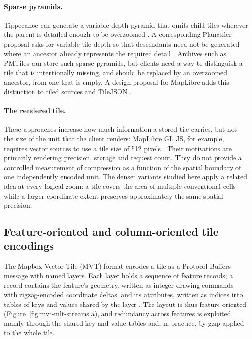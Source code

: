 \paragraph{Sparse pyramids.} Tippecanoe can generate a variable-depth pyramid that omits
child tiles wherever the parent is detailed enough to be overzoomed \citep{tippecanoe}.
A corresponding Planetiler proposal asks for variable tile depth so that descendants
need not be generated where an ancestor already represents the required detail
\citep{planetiler_1574}. Archives such as PMTiles can store such sparse pyramids, but
clients need a way to distinguish a tile that is intentionally missing, and should be
replaced by an overzoomed ancestor, from one that is empty. A design proposal for
MapLibre adds this distinction to tiled sources and TileJSON
\citep{maplibre_stylespec_1869}.

\paragraph{The rendered tile.} These approaches increase how much information a stored
tile carries, but not the size of the unit that the client renders: MapLibre GL JS, for
example, requires vector sources to use a tile size of 512 pixels
\citep{maplibre_gljs_vectorsource}. Their motivations are primarily rendering precision,
storage and request count. They do not provide a controlled measurement of compression
as a function of the spatial boundary of one independently encoded unit. The denser
variants studied here apply a related idea at every logical zoom: a tile covers the area
of multiple conventional cells while a larger coordinate extent preserves approximately
the same spatial precision.

\subsection{Feature-oriented and column-oriented tile encodings}
\label{sec:bg-encodings}

The Mapbox Vector Tile (MVT) format encodes a tile as a Protocol Buffers message with
named layers. Each layer holds a sequence of feature records; a record contains the
feature's geometry, written as integer drawing commands with zigzag-encoded coordinate
deltas, and its attributes, written as indices into tables of keys and values shared by
the layer \citep{mapbox_mvt_spec_2_1}. The layout is thus feature-oriented
(Figure~\ref{fig:mvt-mlt-streams}a), and redundancy across features is exploited mainly
through the shared key and value tables and, in practice, by gzip applied to the whole
tile.

